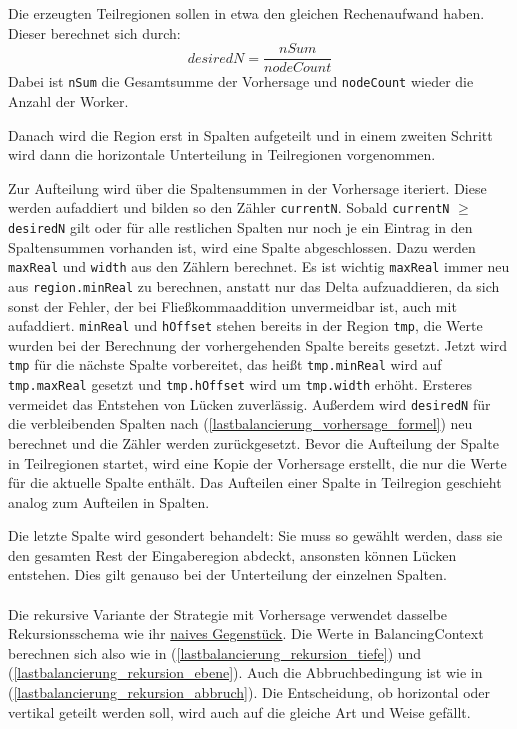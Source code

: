 Die erzeugten Teilregionen sollen in etwa den gleichen Rechenaufwand haben. Dieser berechnet sich durch:
\begin{equation}\label{lastbalancierung_vorhersage_formel}
	desiredN = \frac{nSum}{nodeCount}
\end{equation}
Dabei ist \verb|nSum| die Gesamtsumme der Vorhersage und \verb|nodeCount| wieder die Anzahl der Worker.

Danach wird die Region erst in Spalten aufgeteilt und in einem zweiten Schritt wird dann die horizontale Unterteilung in Teilregionen vorgenommen.

Zur Aufteilung wird über die Spaltensummen in der Vorhersage iteriert. Diese werden aufaddiert und bilden so den Zähler \verb|currentN|.
Sobald \verb|currentN| $\geq$ \verb|desiredN| gilt oder für alle restlichen Spalten nur noch je ein Eintrag in den Spaltensummen vorhanden ist, wird eine Spalte abgeschlossen.
Dazu werden \verb|maxReal| und \verb|width| aus den Zählern berechnet. Es ist wichtig \verb|maxReal| immer neu aus \verb|region.minReal| zu berechnen, anstatt nur das Delta aufzuaddieren, da sich sonst der Fehler, der bei Fließkommaaddition unvermeidbar ist, auch mit aufaddiert. \verb|minReal| und \verb|hOffset| stehen bereits in der Region \verb|tmp|, die Werte wurden bei der Berechnung der vorhergehenden Spalte bereits gesetzt.
Jetzt wird \verb|tmp| für die nächste Spalte vorbereitet, das heißt \verb|tmp.minReal| wird auf \verb|tmp.maxReal| gesetzt und \verb|tmp.hOffset| wird um \verb|tmp.width| erhöht. Ersteres vermeidet das Entstehen von Lücken zuverlässig.
Außerdem wird \verb|desiredN| für die verbleibenden Spalten nach (\ref{lastbalancierung_vorhersage_formel}) neu berechnet und die Zähler werden zurückgesetzt.
Bevor die Aufteilung der Spalte in Teilregionen startet, wird eine Kopie der Vorhersage erstellt, die nur die Werte für die aktuelle Spalte enthält.
Das Aufteilen einer Spalte in Teilregion geschieht analog zum Aufteilen in Spalten.

Die letzte Spalte wird gesondert behandelt: Sie muss so gewählt werden, dass sie den gesamten Rest der Eingaberegion abdeckt, ansonsten können Lücken entstehen.
Dies gilt genauso bei der Unterteilung der einzelnen Spalten.

\paragraph*{}
Die rekursive Variante der Strategie mit Vorhersage verwendet dasselbe Rekursionsschema wie ihr \hyperref[lastbalancierung_naiv_rekursion]{naives Gegenstück}.
Die Werte in BalancingContext berechnen sich also wie in (\ref{lastbalancierung_rekursion_tiefe}) und (\ref{lastbalancierung_rekursion_ebene}).
Auch die Abbruchbedingung ist wie in (\ref{lastbalancierung_rekursion_abbruch}). Die Entscheidung, ob horizontal oder vertikal geteilt werden soll, wird auch auf die gleiche Art und Weise gefällt.

